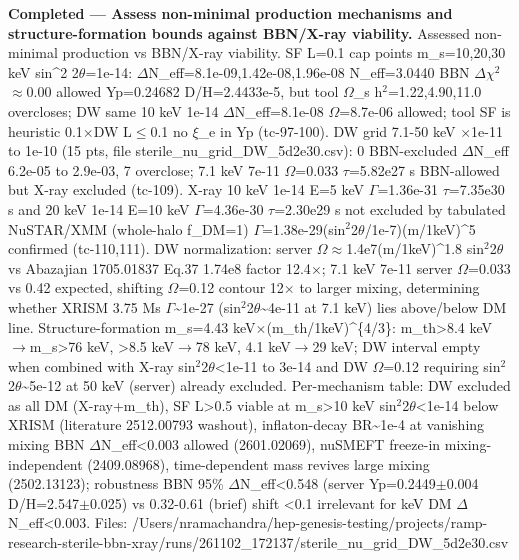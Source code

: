 \documentclass[11pt,a4paper]{article}
\begin{document}
\textbf{Completed --- Assess non-minimal production mechanisms and structure-formation bounds against BBN/X-ray viability.} Assessed non-minimal production vs BBN/X-ray viability. SF L=0.1 cap points m\_s=10,20,30 keV sin\textasciicircum{}2 2$\theta$=1e-14: $\Delta$N\_eff=8.1e-09,1.42e-08,1.96e-08 N\_eff=3.0440 BBN $\Delta$$\chi$$^2$$\approx$0.00 allowed Yp=0.24682 D/H=2.4433e-5, but tool $\Omega$\_s h$^2$=1.22,4.90,11.0 overcloses; DW same 10 keV 1e-14 $\Delta$N\_eff=8.1e-08 $\Omega$=8.7e-06 allowed; tool SF is heuristic 0.1$\times$DW L$\leq$0.1 no $\xi$\_e in Yp (tc-97-100). DW grid 7.1-50 keV $\times$1e-11 to 1e-10 (15 pts, file sterile\_nu\_grid\_DW\_5d2e30.csv): 0 BBN-excluded $\Delta$N\_eff 6.2e-05 to 2.9e-03, 7 overclose; 7.1 keV 7e-11 $\Omega$=0.033 $\tau$=5.82e27 s BBN-allowed but X-ray excluded (tc-109). X-ray 10 keV 1e-14 E=5 keV $\Gamma$=1.36e-31 $\tau$=7.35e30 s and 20 keV 1e-14 E=10 keV $\Gamma$=4.36e-30 $\tau$=2.30e29 s not excluded by tabulated NuSTAR/XMM (whole-halo f\_DM=1) $\Gamma$=1.38e-29(sin$^2$2$\theta$/1e-7)(m/1keV)\textasciicircum{}5 confirmed (tc-110,111). DW normalization: server $\Omega$$\approx$1.4e7(m/1keV)\textasciicircum{}1.8 sin$^2$2$\theta$ vs Abazajian 1705.01837 Eq.37 1.74e8 factor 12.4$\times$; 7.1 keV 7e-11 server $\Omega$=0.033 vs 0.42 expected, shifting $\Omega$=0.12 contour 12$\times$ to larger mixing, determining whether XRISM 3.75 Ms $\Gamma$\textasciitilde{}1e-27 (sin$^2$2$\theta$\textasciitilde{}4e-11 at 7.1 keV) lies above/below DM line. Structure-formation m\_s=4.43 keV$\times$(m\_th/1keV)\textasciicircum{}\{4/3\}: m\_th\textgreater{}8.4 keV$\to$m\_s\textgreater{}76 keV, \textgreater{}8.5 keV$\to$78 keV, 4.1 keV$\to$29 keV; DW interval empty when combined with X-ray sin$^2$2$\theta$\textless{}1e-11 to 3e-14 and DW $\Omega$=0.12 requiring sin$^2$2$\theta$\textasciitilde{}5e-12 at 50 keV (server) already excluded. Per-mechanism table: DW excluded as all DM (X-ray+m\_th), SF L\textgreater{}0.5 viable at m\_s\textgreater{}10 keV sin$^2$2$\theta$\textless{}1e-14 below XRISM (literature 2512.00793 washout), inflaton-decay BR\textasciitilde{}1e-4 at vanishing mixing BBN $\Delta$N\_eff\textless{}0.003 allowed (2601.02069), nuSMEFT freeze-in mixing-independent (2409.08968), time-dependent mass revives large mixing (2502.13123); robustness BBN 95\% $\Delta$N\_eff\textless{}0.548 (server Yp=0.2449$\pm$0.004 D/H=2.547$\pm$0.025) vs 0.32-0.61 (brief) shift \textless{}0.1 irrelevant for keV DM $\Delta$N\_eff\textless{}0.003. Files: /Users/nramachandra/hep-genesis-testing/projects/ramp-research-sterile-bbn-xray/runs/261102\_172137/sterile\_nu\_grid\_DW\_5d2e30.csv
\end{document}
